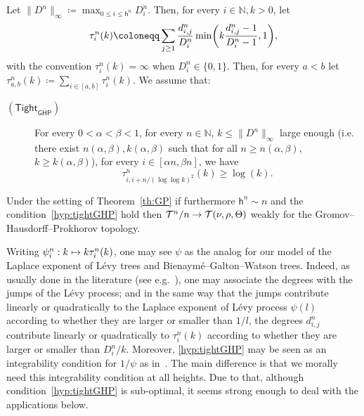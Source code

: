 \documentclass[AHL,Unicode,published]{cedram}
\makeatletter
\newcommand{\optionaldesc}[2]{
\phantomsection #1\protected@edef\@currentlabel{#1}\label{#2}
}
\newcommand{\N}{\mathbb{N}}
\newcommand{\1}{\mathbbm{1}}
\newcommand{\T}{\mathcal{T}}
\newcommand{\h}{\mathsf{h}}
\newcommand{\sTight}{\mathsf{Tight}}
\newcommand{\sGHP}{\mathsf{GHP}}
\let\originalleft\left
\let\originalright\right
\renewcommand{\left}{\mathopen{}\mathclose\bgroup\originalleft}
\renewcommand{\right}{\aftergroup\egroup\originalright}
\renewcommand*{\to}{\mathchoice{\longrightarrow}{\rightarrow}{\rightarrow}{\rightarrow}}
\let\oldmapsto\mapsto
\renewcommand*{\mapsto}{\mathchoice{\longmapsto}{\oldmapsto}{\oldmapsto}{\oldmapsto}}
\makeatother
\begin{document}
Let $\|D^n\|_\infty\coloneqq \max_{0\leq i\leq \h^n} D_i^n$.
Then, for every $i\in \N, k>0$, let
\begin{equation}\label{eq def tau}
\tau^n_{i}(k)\coloneqq\sum_{j\ge 1} \frac{d^n_{i,j}}{D^n_i} \min\left (k\frac{d^n_{i,j}-1}{D^n_i-1},1 \right),
\end{equation}
with the convention $\tau^n_i(k)=\infty$ when $D^n_i\in \{0,1\}$. Then, for every $a<b$ let $\tau^n_{a,b}(k)\coloneqq\sum_{i\in [a,b]}\tau^n_i(k)$. We assume that:
\smallskip
\begin{mdframed}[linecolor=black!60]
\begin{description}
\item[\textcolor{link}{\optionaldesc{$(\sTight_{\sGHP})$}{hyp:tightGHP}}] For every $0<\alpha<\beta<1$, for every $n\in \N$, $k\leq \|D^n\|_\infty$ large enough (i.e. there exist $n(\alpha, \beta), k(\alpha, \beta)$ such that for all $n\geq n(\alpha,\beta)$, $k\geq k(\alpha,\beta)$), for every $i\in [\alpha n,\beta n]$, we have
\[
\tau_{i,i+n/(\log \log k)^2}^n(k)\geq \log(k).
\]
\end{description}
\end{mdframed}

\begin{theo}\label{th:GHP}
Under the setting of Theorem~\ref{th:GP} if furthermore $\h^n\sim n$ and the condition~\ref{hyp:tightGHP} hold then
$\T^n/n\to \T(\nu,\rho,\Theta)$ weakly for the Gromov--Hausdorff--Prokhorov topology.
\end{theo}

\begin{rema}
Writing $\psi_i^n:k\mapsto k\tau_i^n(k)$, one may see $\psi$ as the analog for our model of the Laplace exponent of Lévy trees and Bienaymé--Galton--Watson trees. {Indeed, as usually done in the literature (see e.g.~\cite{DLG05}), one may associate the degrees with the jumps of the Lévy process; and in the same way that the jumps contribute linearly or quadratically to the Laplace exponent of Lévy process $\psi(l)$ according to whether they are larger or smaller than $1/l$, the degrees $d_{i,j}^n$ contribute linearly or quadratically to $\tau_i^n(k)$ according to whether they are larger or smaller than $D_i^n/k$.} Moreover, \ref{hyp:tightGHP} may be seen as an integrability condition for $1/\psi$ { as in~\cite[Eq.~(7)]{DLG05}}. The main difference is that we morally need this integrability condition at all heights. Due to that, although condition~\ref{hyp:tightGHP} is sub-optimal, it seems strong enough to deal with the applications below.
\end{rema}
\end{document}
